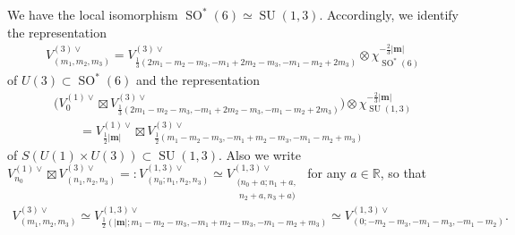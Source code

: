 \documentclass[pdftex]{sigma}
\numberwithin{equation}{section}
\newcommand{\bm}{\mathbf{m}}
\newcommand{\BR}{\mathbb{R}}
\begin{document}
We have the local isomorphism $\operatorname{SO}^*(6)\simeq \operatorname{SU}(1,3)$. Accordingly, we identify the representation
\begin{gather*} V_{(m_1,m_2,m_3)}^{(3)\vee}=V_{\frac{1}{3}(2m_1-m_2-m_3,-m_1+2m_2-m_3,-m_1-m_2+2m_3)}^{(3)\vee}\otimes\chi_{\operatorname{SO}^*(6)}^{-\frac{2}{3}|\bm|} \end{gather*}
of $U(3)\subset \operatorname{SO}^*(6)$ and the representation
\begin{gather*}
 \big(V_0^{(1)\vee}\boxtimes V_{\frac{1}{3}(2m_1-m_2-m_3,-m_1+2m_2-m_3,-m_1-m_2+2m_3)}^{(3)\vee}\big)\otimes\chi_{\operatorname{SU}(1,3)}^{-\frac{2}{3}|\bm|}\\
 \qquad {} =V_{\frac{1}{2}|\bm|}^{(1)\vee}\boxtimes V_{\frac{1}{2}(m_1-m_2-m_3,-m_1+m_2-m_3,-m_1-m_2+m_3)}^{(3)\vee}
\end{gather*}
of $S(U(1)\times U(3))\subset \operatorname{SU}(1,3)$. Also we write $V_{n_0}^{(1)\vee}\boxtimes V_{(n_1,n_2,n_3)}^{(3)\vee}=:V_{(n_0;n_1,n_2,n_3)}^{(1,3)\vee}
\simeq V_{\substack{(n_0+a;n_1+a,\ \\ \ n_2+a,n_3+a)}}^{(1,3)\vee}$ for any $a\in\BR$, so that
\begin{gather*} V_{(m_1,m_2,m_3)}^{(3)\vee}\simeq V_{\frac{1}{2}(|\bm|;m_1-m_2-m_3,-m_1+m_2-m_3,-m_1-m_2+m_3)}^{(1,3)\vee}
\simeq V_{(0;-m_2-m_3,-m_1-m_3,-m_1-m_2)}^{(1,3)\vee}. \end{gather*}
\end{document}
